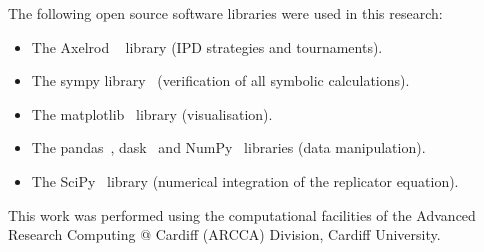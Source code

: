 \documentclass[10pt,letterpaper]{article}
\begin{document}
The following open source software libraries were used in this research:

\begin{itemize}
    \item The Axelrod ~\cite{Knight2016, Knight2018} library (IPD strategies and
        tournaments).
    \item The sympy library~\cite{Meurer2017} (verification of all symbolic
        calculations).
    \item The matplotlib~\cite{Droettboom2018} library (visualisation).
    \item The pandas~\cite{Structures2010}, dask~\cite{Dask2016} and
        NumPy~\cite{Oliphant2015} libraries (data manipulation).
    \item The SciPy~\cite{Jones2001} library (numerical integration of the
        replicator equation).
\end{itemize}

This work was performed using the computational facilities of the Advanced
Research Computing @ Cardiff (ARCCA) Division, Cardiff University.

\nolinenumbers
\end{document}
